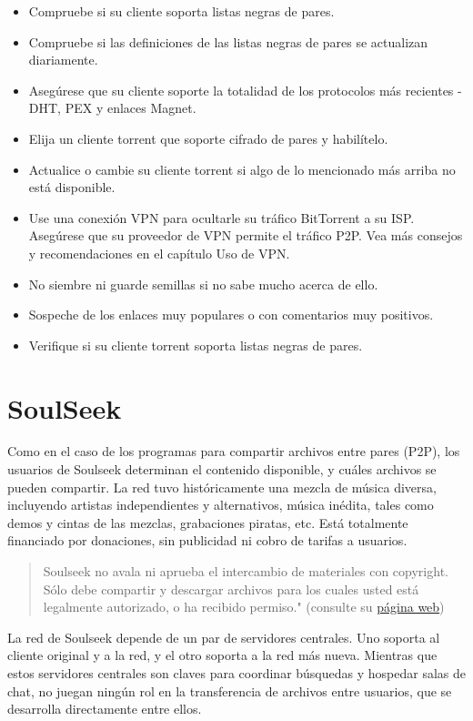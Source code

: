 \documentclass[10pt,a5paper,twoside,,]{book}
\providecommand{\tightlist}{%
  \setlength{\itemsep}{0pt}\setlength{\parskip}{0pt}}
\begin{document}
\begin{itemize}
\tightlist
\item
  Compruebe si su cliente soporta listas negras de pares.
\item
  Compruebe si las definiciones de las listas negras de pares se
  actualizan diariamente.
\item
  Asegúrese que su cliente soporte la totalidad de los protocolos más
  recientes - DHT, PEX y enlaces Magnet.
\item
  Elija un cliente torrent que soporte cifrado de pares y habilítelo.
\item
  Actualice o cambie su cliente torrent si algo de lo mencionado más
  arriba no está disponible.
\item
  Use una conexión VPN para ocultarle su tráfico BitTorrent a su ISP.
  Asegúrese que su proveedor de VPN permite el tráfico P2P. Vea más
  consejos y recomendaciones en el capítulo Uso de VPN.
\item
  No siembre ni guarde semillas si no sabe mucho acerca de ello.
\item
  Sospeche de los enlaces muy populares o con comentarios muy positivos.
\item
  Verifique si su cliente torrent soporta listas negras de pares.
\end{itemize}

\section{SoulSeek}\label{soulseek}

Como en el caso de los programas para compartir archivos entre pares
(P2P), los usuarios de Soulseek determinan el contenido disponible, y
cuáles archivos se pueden compartir. La red tuvo históricamente una
mezcla de música diversa, incluyendo artistas independientes y
alternativos, música inédita, tales como demos y cintas de las mezclas,
grabaciones piratas, etc. Está totalmente financiado por donaciones, sin
publicidad ni cobro de tarifas a usuarios.

\begin{quote}
Soulseek no avala ni aprueba el intercambio de materiales con copyright.
Sólo debe compartir y descargar archivos para los cuales usted está
legalmente autorizado, o ha recibido permiso." (consulte su
\href{http://www.soulseekqt.net\%5D}{página web})
\end{quote}

La red de Soulseek depende de un par de servidores centrales. Uno
soporta al cliente original y a la red, y el otro soporta a la red más
nueva. Mientras que estos servidores centrales son claves para coordinar
búsquedas y hospedar salas de chat, no juegan ningún rol en la
transferencia de archivos entre usuarios, que se desarrolla directamente
entre ellos.
\end{document}

